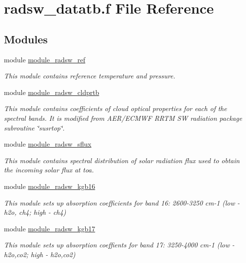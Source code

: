 \hypertarget{radsw__datatb_8f}{}\section{radsw\+\_\+datatb.\+f File Reference}
\label{radsw__datatb_8f}
\subsection*{Modules}
\begin{DoxyCompactItemize}
\item 
module \hyperlink{namespacemodule__radsw__ref}{module\+\_\+radsw\+\_\+ref}
\begin{DoxyCompactList}\small\item\em This module contains reference temperature and pressure. \end{DoxyCompactList}\item 
module \hyperlink{namespacemodule__radsw__cldprtb}{module\+\_\+radsw\+\_\+cldprtb}
\begin{DoxyCompactList}\small\item\em This module contains coefficients of cloud optical properties for each of the spectral bands. It is modified from A\+E\+R/\+E\+C\+M\+WF R\+R\+TM SW radiation package subroutine \char`\"{}susrtop\char`\"{}. \end{DoxyCompactList}\item 
module \hyperlink{namespacemodule__radsw__sflux}{module\+\_\+radsw\+\_\+sflux}
\begin{DoxyCompactList}\small\item\em This module contains spectral distribution of solar radiation flux used to obtain the incoming solar flux at toa. \end{DoxyCompactList}\item 
module \hyperlink{namespacemodule__radsw__kgb16}{module\+\_\+radsw\+\_\+kgb16}
\begin{DoxyCompactList}\small\item\em This module sets up absorption coefficients for band 16\+: 2600-\/3250 cm-\/1 (low -\/ h2o, ch4; high -\/ ch4) \end{DoxyCompactList}\item 
module \hyperlink{namespacemodule__radsw__kgb17}{module\+\_\+radsw\+\_\+kgb17}
\begin{DoxyCompactList}\small\item\em This module sets up absorption coeffients for band 17\+: 3250-\/4000 cm-\/1 (low -\/ h2o,co2; high -\/ h2o,co2) \end{DoxyCompactList}\item 

\end{DoxyCompactItemize}

